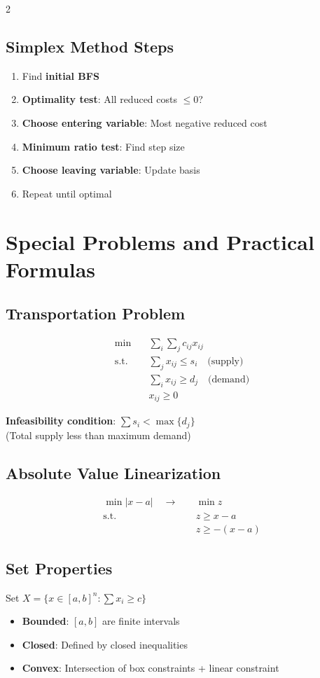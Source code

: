 \documentclass[10pt,a4paper,landscape]{article}
\begin{document}
\begin{multicols}{2}
\subsection*{Simplex Method Steps}
\begin{enumerate}
\item Find \textbf{initial BFS}
\item \textbf{Optimality test}: All reduced costs $\leq 0$?
\item \textbf{Choose entering variable}: Most negative reduced cost
\item \textbf{Minimum ratio test}: Find step size
\item \textbf{Choose leaving variable}: Update basis
\item Repeat until optimal
\end{enumerate}

\columnbreak

\section*{Special Problems and Practical Formulas}

\subsection*{Transportation Problem}
\begin{align}
\min \quad & \sum_i \sum_j c_{ij} x_{ij} \\
\text{s.t.} \quad & \sum_j x_{ij} \leq s_i \quad \text{(supply)} \\
& \sum_i x_{ij} \geq d_j \quad \text{(demand)} \\
& x_{ij} \geq 0
\end{align}

\textbf{Infeasibility condition}: $\sum s_i < \max\{d_j\}$
\\(Total supply less than maximum demand)

\subsection*{Absolute Value Linearization}
\begin{align}
\min |x - a| \quad \rightarrow \quad & \min z \\
\text{s.t.} \quad & z \geq x - a \\
& z \geq -(x - a)
\end{align}

\subsection*{Set Properties}
Set $X = \{x \in [a,b]^n : \sum x_i \geq c\}$
\begin{itemize}
\item \textbf{Bounded}: $[a,b]$ are finite intervals
\item \textbf{Closed}: Defined by closed inequalities
\item \textbf{Convex}: Intersection of box constraints + linear constraint
\end{itemize}


\end{multicols}
\end{document}
